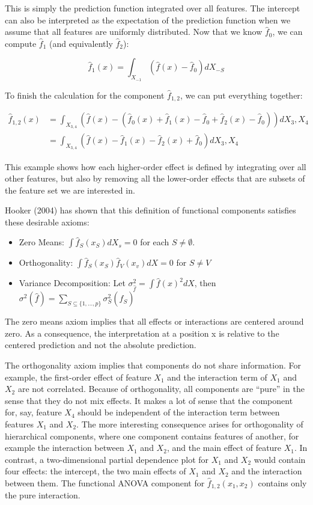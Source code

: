 \documentclass[
  10pt,
]{scrbook}
\providecommand{\tightlist}{%
  \setlength{\itemsep}{0pt}\setlength{\parskip}{0pt}}
\begin{document}
This is simply the prediction function integrated over all features.
The intercept can also be interpreted as the expectation of the prediction function when we assume that all features are uniformly distributed.
Now that we know \(\hat{f}_0\), we can compute \(\hat{f}_1\) (and equivalently \(\hat{f}_2\)):

\[\hat{f}_1(x) = \int_{X_{-1}} \left( \hat{f}(x) - \hat{f}_0\right) d X_{-S}\]

To finish the calculation for the component \(\hat{f}_{1,2}\), we can put everything together:

\begin{align*}\hat{f}_{1,2}(x) &= \int_{X_{3,4}} \left( \hat{f}(x) - (\hat{f}_0(x) + \hat{f}_1(x) - \hat{f}_0 + \hat{f}_2(x) - \hat{f}_0)\right) d X_{3},X_4 \\  &= \int_{X_{3,4}} \left(\hat{f}(x) - \hat{f}_1(x) - \hat{f}_2(x) + \hat{f}_0\right) d X_{3},X_4 \end{align*}

This example shows how each higher-order effect is defined by integrating over all other features, but also by removing all the lower-order effects that are subsets of the feature set we are interested in.

Hooker (2004) has shown that this definition of functional components satisfies these desirable axioms:

\begin{itemize}
\tightlist
\item
  Zero Means: \(\int{}\hat{f}_S(x_S)dX_s=0\) for each \(S\neq\emptyset\).
\item
  Orthogonality: \(\int{}\hat{f}_S(x_S)\hat{f}_V(x_v)dX=0\) for \(S\neq{}V\)
\item
  Variance Decomposition: Let \(\sigma^2_{\hat{f}}=\int \hat{f}(x)^2dX\), then \(\sigma^2(\hat{f}) = \sum_{S \subseteq \{1,\ldots,p\}} \sigma^2_S(\hat{f}_S)\)
\end{itemize}

The zero means axiom implies that all effects or interactions are centered around zero.
As a consequence, the interpretation at a position x is relative to the centered prediction and not the absolute prediction.

The orthogonality axiom implies that components do not share information.
For example, the first-order effect of feature \(X_1\) and the interaction term of \(X_{1}\) and \(X_2\) are not correlated.
Because of orthogonality, all components are ``pure'' in the sense that they do not mix effects.
It makes a lot of sense that the component for, say, feature \(X_4\) should be independent of the interaction term between features \(X_1\) and \(X_2\).
The more interesting consequence arises for orthogonality of hierarchical components, where one component contains features of another, for example the interaction between \(X_1\) and \(X_2\), and the main effect of feature \(X_1\).
In contrast, a two-dimensional partial dependence plot for \(X_1\) and \(X_2\) would contain four effects: the intercept, the two main effects of \(X_1\) and \(X_2\) and the interaction between them.
The functional ANOVA component for \(\hat{f}_{1,2}(x_1,x_2)\) contains only the pure interaction.
\end{document}
